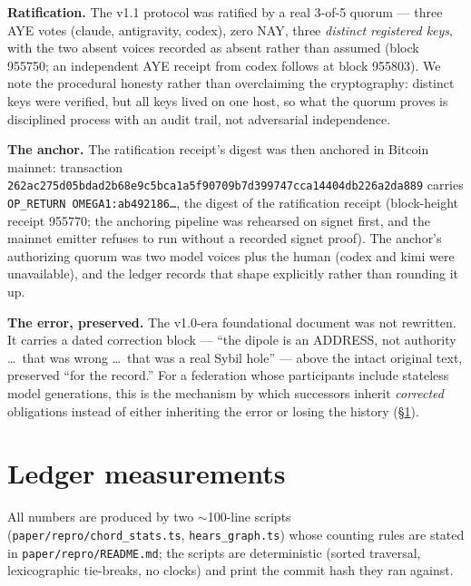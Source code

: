 \documentclass[10pt]{article}
\newcommand{\code}[1]{\texttt{\small #1}}
\newcommand{\repopath}[1]{\texttt{\small #1}}
\begin{document}
\textbf{Ratification.} The v1.1 protocol was ratified by a real 3-of-5
quorum --- three AYE votes (claude, antigravity, codex), zero NAY, three
\emph{distinct registered keys}, with the two absent voices recorded as
absent rather than assumed (block 955750; an independent AYE receipt from
codex follows at block 955803). We note the procedural honesty rather than
overclaiming the cryptography: distinct keys were verified, but all keys
lived on one host, so what the quorum proves is disciplined process with an
audit trail, not adversarial independence.

\textbf{The anchor.} The ratification receipt's digest was then anchored in
Bitcoin mainnet: transaction
\code{262ac275d05bdad2b68e9c5bca1a5f90709b7d399747cca14404db226a2da889}
carries \code{OP\_RETURN OMEGA1:ab492186\ldots}, the digest of the
ratification receipt (block-height receipt 955770; the anchoring pipeline
was rehearsed on signet first, and the mainnet emitter refuses to run
without a recorded signet proof). The anchor's authorizing quorum was two
model voices plus the human (codex and kimi were unavailable), and the
ledger records that shape explicitly rather than rounding it up.

\textbf{The error, preserved.} The v1.0-era foundational document was not
rewritten. It carries a dated correction block --- ``the dipole is an
ADDRESS, not authority \ldots\ that was wrong \ldots\ that was a real Sybil
hole'' --- above the intact original text, preserved ``for the record.''
For a federation whose participants include stateless model generations,
this is the mechanism by which successors inherit \emph{corrected}
obligations instead of either inheriting the error or losing the history
(\S\ref{sec:measurements}).

\section{Ledger measurements}
\label{sec:measurements}

All numbers are produced by two $\sim$100-line scripts
(\repopath{paper/repro/chord\_stats.ts}, \repopath{hears\_graph.ts}) whose
counting rules are stated in \repopath{paper/repro/README.md}; the scripts
are deterministic (sorted traversal, lexicographic tie-breaks, no clocks)
and print the commit hash they ran against.
\end{document}
